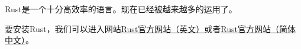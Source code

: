 
Rust是一个十分高效率的语言。现在已经被越来越多的运用了。

要安装Rust，我们可以进入网站\href{https://www.rust-lang.org/learn/get-started}{Rust官方网站（英文）}或者\href{https://www.rust-lang.org/zh-CN/learn/get-started}{Rust官方网站（简体中文）}。

